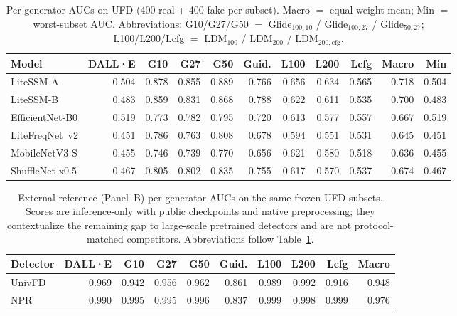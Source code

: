 \begin{table}[H]
\caption{Per-generator AUCs on UFD (400 real + 400 fake per subset).
Macro $=$ equal-weight mean; Min $=$ worst-subset AUC.
Abbreviations: G10/G27/G50 $=$ Glide$_{100,10}$ / Glide$_{100,27}$ / Glide$_{50,27}$; L100/L200/Lcfg $=$ LDM$_{100}$ / LDM$_{200}$ / LDM$_{200,\mathrm{cfg}}$.\label{tab:ufd}}
\scriptsize
\setlength{\tabcolsep}{2.6pt}
\begin{tabularx}{\textwidth}{@{}P{2.05cm}*{10}{R}@{}}
\toprule
\textbf{Model} & \textbf{DALL·E} & \textbf{G10} & \textbf{G27} & \textbf{G50} & \textbf{Guid.} & \textbf{L100} & \textbf{L200} & \textbf{Lcfg} & \textbf{Macro} & \textbf{Min} \\
\midrule
LiteSSM-A & 0.504 & 0.878 & 0.855 & 0.889 & 0.766 & 0.656 & 0.634 & 0.565 & 0.718 & 0.504 \\
LiteSSM-B & 0.483 & 0.859 & 0.831 & 0.868 & 0.788 & 0.622 & 0.611 & 0.535 & 0.700 & 0.483 \\
EfficientNet-B0 & 0.519 & 0.773 & 0.782 & 0.795 & 0.720 & 0.613 & 0.577 & 0.557 & 0.667 & 0.519 \\
LiteFreqNet~v2 & 0.451 & 0.786 & 0.763 & 0.808 & 0.678 & 0.594 & 0.551 & 0.531 & 0.645 & 0.451 \\
MobileNetV3-S & 0.455 & 0.746 & 0.739 & 0.770 & 0.656 & 0.621 & 0.580 & 0.518 & 0.636 & 0.455 \\
ShuffleNet-x0.5 & 0.467 & 0.805 & 0.802 & 0.835 & 0.755 & 0.617 & 0.570 & 0.537 & 0.674 & 0.467 \\
\bottomrule
\end{tabularx}
\end{table}

\begin{table}[H]
\caption{External reference (Panel~B) per-generator AUCs on the same frozen UFD subsets.
Scores are inference-only with public checkpoints and native preprocessing; they contextualize the remaining gap to large-scale pretrained detectors and are not protocol-matched competitors.
Abbreviations follow Table~\ref{tab:ufd}.\label{tab:ufd-ext}}
\scriptsize
\setlength{\tabcolsep}{2.8pt}
\begin{tabularx}{\textwidth}{@{}P{1.7cm}*{9}{R}@{}}
\toprule
\textbf{Detector} & \textbf{DALL·E} & \textbf{G10} & \textbf{G27} & \textbf{G50} & \textbf{Guid.} & \textbf{L100} & \textbf{L200} & \textbf{Lcfg} & \textbf{Macro} \\
\midrule
UnivFD~\cite{ojha2023ufd} & 0.969 & 0.942 & 0.956 & 0.962 & 0.861 & 0.989 & 0.992 & 0.916 & 0.948 \\
NPR~\cite{tan2024npr} & 0.990 & 0.995 & 0.995 & 0.996 & 0.837 & 0.999 & 0.998 & 0.999 & 0.976 \\
\bottomrule
\end{tabularx}
\end{table}

